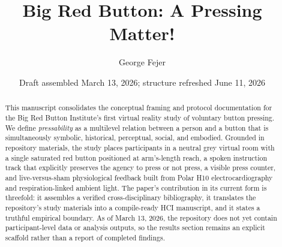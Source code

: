 \documentclass[12pt,a4paper]{article}
\title{Big Red Button: A Pressing Matter!}
\author{George Fejer}
\date{Draft assembled March 13, 2026; structure refreshed June 11, 2026}
\begin{document}
\maketitle

\begin{abstract}
This manuscript consolidates the conceptual framing and protocol documentation for the Big Red Button Institute's first virtual reality study of voluntary button pressing. We define \emph{pressability} as a multilevel relation between a person and a button that is simultaneously symbolic, historical, perceptual, social, and embodied. Grounded in repository materials, the study places participants in a neutral grey virtual room with a single saturated red button positioned at arm's-length reach, a spoken instruction track that explicitly preserves the agency to press or not press, a visible press counter, and live-versus-sham physiological feedback built from Polar H10 electrocardiography and respiration-linked ambient light. The paper's contribution in its current form is threefold: it assembles a verified cross-disciplinary bibliography, it translates the repository's study materials into a compile-ready HCI manuscript, and it states a truthful empirical boundary. As of March 13, 2026, the repository does not yet contain participant-level data or analysis outputs, so the results section remains an explicit scaffold rather than a report of completed findings.
\end{abstract}







\end{document}
